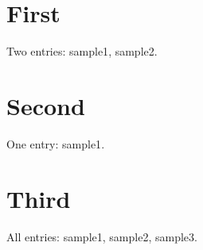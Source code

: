 \documentclass{report}
\begin{document}
\chapter{First}

Two entries: \gls{sample1}, \gls{sample2}.

\chapter{Second}

One entry: \gls{sample1}.

\chapter{Third}

All entries: \gls{sample1}, \gls{sample2}, \gls{sample3}.

\printglossaries
\end{document}
